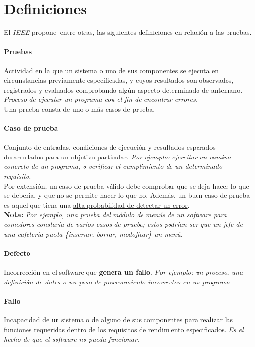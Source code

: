 \section{Definiciones}

El \textit{IEEE} propone, entre otras, las siguientes definiciones en relación a las pruebas.

\paragraph{Pruebas} Actividad en la que un sistema o uno de sus componentes se ejecuta en circunstancias previamente especificadas, y cuyos resultados son observados, registrados y evaluados comprobando algún aspecto determinado de antemano. \textit{Proceso de ejecutar un programa con el fin de encontrar errores.}\\

Una prueba consta de uno o más casos de prueba.

\paragraph{Caso de prueba} Conjunto de entradas, condiciones de ejecución y resultados esperados desarrollados para un objetivo particular. \textit{Por ejemplo: ejercitar un camino concreto de un programa, o verificar el cumplimiento de un determinado requisito.}\\

Por extensión, un caso de prueba válido debe comprobar que se deja hacer lo que se debería, y que no se permite hacer lo que no. Además, un buen caso de prueba es aquel que tiene una \uline{alta probabilidad de detectar un error}.\\

\textbf{Nota:} \textit{Por ejemplo, una prueba del módulo de menús de un software para comedores constaría de varios casos de prueba; estos podrían ser que un jefe de una cafetería pueda \{insertar, borrar, modoficar\} un menú.}

\paragraph{Defecto} Incorrección en el software que \textbf{genera un fallo}. \textit{Por ejemplo: un proceso, una definición de datos o un paso de procesamiento incorrectos en un programa.}

\paragraph{Fallo} Incapacidad de un sistema o de alguno de sus componentes para realizar las funciones requeridas dentro de los requisitos de rendimiento especificados. \textit{Es el hecho de que el software no pueda funcionar.}

